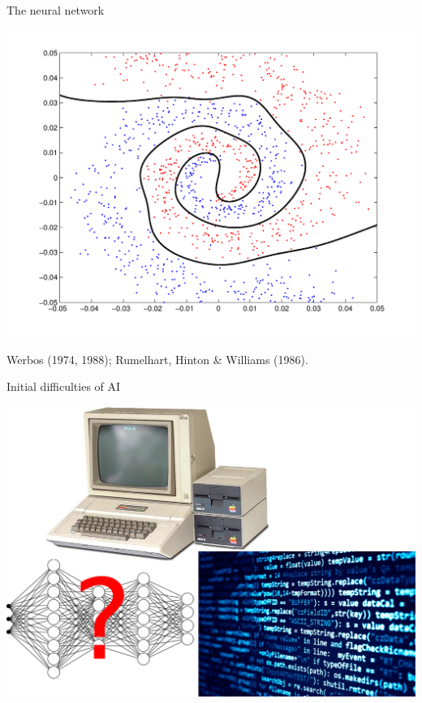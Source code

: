 \documentclass{beamer}
\begin{document}
\begin{frame}{The neural network}
\begin{center}
       \includegraphics[scale=0.18]{pics/spiral.pdf}
\end{center}

Werbos (1974, 1988);  Rumelhart, Hinton \& Williams (1986). 
\end{frame}

\begin{frame}{Initial difficulties of AI}
\begin{center}
\includegraphics[scale=0.4]{pics/old_computing.pdf}
\end{center}
\end{frame}
\end{document}

